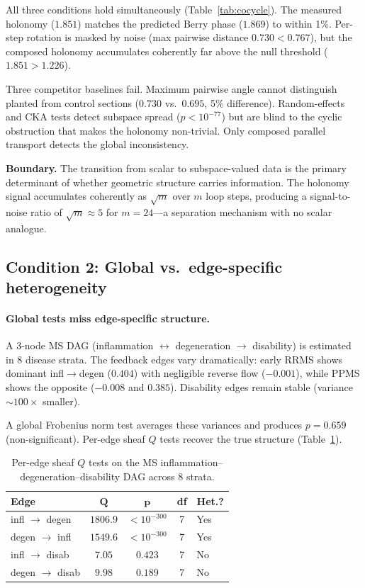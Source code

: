 \documentclass[11pt]{article}
\begin{document}
All three conditions hold simultaneously (Table~\ref{tab:cocycle}).
The measured holonomy ($1.851$) matches the predicted Berry phase ($1.869$) to within 1\%.
Per-step rotation is masked by noise (max pairwise distance $0.730 < 0.767$), but the composed holonomy accumulates coherently far above the null threshold ($1.851 > 1.226$).

Three competitor baselines fail.
Maximum pairwise angle cannot distinguish planted from control sections ($0.730$ vs.\ $0.695$, 5\% difference).
Random-effects and CKA tests detect subspace spread ($p < 10^{-77}$) but are blind to the cyclic obstruction that makes the holonomy non-trivial.
Only composed parallel transport detects the global inconsistency.

\textbf{Boundary.} The transition from scalar to subspace-valued data is the primary determinant of whether geometric structure carries information.
The holonomy signal accumulates coherently as $\sqrt{m}$ over $m$ loop steps, producing a signal-to-noise ratio of $\sqrt{m} \approx 5$ for $m = 24$---a separation mechanism with no scalar analogue.

\subsection{Condition 2: Global vs.\ edge-specific heterogeneity}
\label{sec:res-global-vs-edge}

\paragraph{Global tests miss edge-specific structure.}
A 3-node MS DAG (inflammation $\leftrightarrow$ degeneration $\to$ disability) is estimated in 8 disease strata.
The feedback edges vary dramatically: early RRMS shows dominant infl$\to$degen ($0.404$) with negligible reverse flow ($-0.001$), while PPMS shows the opposite ($-0.008$ and $0.385$).
Disability edges remain stable (variance $\sim\!100\times$ smaller).

A global Frobenius norm test averages these variances and produces $p = 0.659$ (non-significant).
Per-edge sheaf $Q$ tests recover the true structure (Table~\ref{tab:dag}).

\begin{table}[t]
\centering
\caption{Per-edge sheaf $Q$ tests on the MS inflammation--degeneration--disability DAG across 8 strata.}
\label{tab:dag}
\small
\begin{tabular}{@{}lcccl@{}}
\toprule
\textbf{Edge} & $\boldsymbol{Q}$ & $\boldsymbol{p}$ & \textbf{df} & \textbf{Het.?} \\
\midrule
infl $\to$ degen & $1806.9$ & $< 10^{-300}$ & 7 & Yes \\
degen $\to$ infl & $1549.6$ & $< 10^{-300}$ & 7 & Yes \\
infl $\to$ disab & $7.05$ & $0.423$ & 7 & No \\
degen $\to$ disab & $9.98$ & $0.189$ & 7 & No \\
\bottomrule
\end{tabular}
\end{table}
\end{document}

